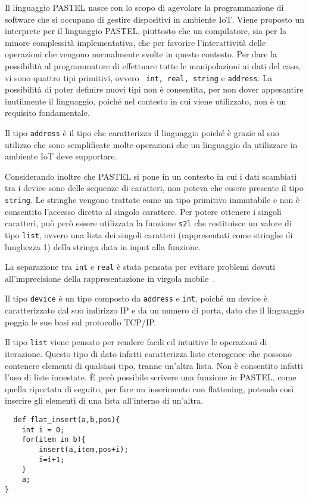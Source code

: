 \documentclass[10pt]{article}
\begin{document}
Il linguaggio PASTEL nasce con lo scopo di agevolare la programmazione di software che si occupano di gestire dispositivi in ambiente IoT. Viene proposto un interprete per il linguaggio PASTEL, piuttosto che un compilatore, sia per la minore complessità implementativa, che per favorire l'interattività delle operazioni che vengono normalmente svolte in questo contesto. Per dare la possibilità al programmatore di effettuare tutte le manipolazioni ai dati del caso, vi sono quattro tipi primitivi, ovvero \texttt{ int, real, string} e \texttt{address}. La possibilità di poter definire nuovi tipi non è consentita, per non dover appesantire inutilmente il linguaggio, poiché nel contesto in cui viene utilizzato, non è un requisito fondamentale. 

Il tipo \texttt{address} è il tipo che caratterizza il linguaggio poiché è grazie al suo utilizzo che sono semplificate molte operazioni che un linguaggio da utilizzare in ambiente IoT deve supportare. 

Considerando inoltre che PASTEL si pone in un contesto in cui i dati scambiati tra i device sono delle sequenze di caratteri, non poteva che essere presente il tipo \texttt{string}. Le stringhe vengono trattate come un tipo primitivo immutabile e non è consentito l'accesso diretto al singolo carattere. Per potere ottenere i singoli caratteri, può però essere utilizzata la funzione \texttt{s2l} che restituisce un valore di tipo \texttt{list}, ovvero una lista dei singoli caratteri (rappresentati come stringhe di lunghezza 1) della stringa data in input alla funzione. 

La separazione tra \texttt{int} e \texttt{real} è stata pensata per evitare problemi dovuti all'imprecisione della rappresentazione in virgola mobile~\cite{benz2012dynamic}. 

Il tipo \texttt{device} è un tipo composto da \texttt{address} e \texttt{int}, poiché un device è caratterizzato dal suo indirizzo IP e da un numero di porta, dato che il linguaggio poggia le sue basi sul protocollo TCP/IP. 

Il tipo \texttt{list} viene pensato per rendere facili ed intuitive le operazioni di iterazione. Questo tipo di dato infatti caratterizza liste eterogenee che possono contenere elementi di qualsiasi tipo, tranne un'altra lista. Non è consentito infatti l'uso di liste innestate. È però possibile scrivere una funzione in PASTEL, come quella riportata di seguito, per fare un inserimento con flattening, potendo così inserire gli elementi di una lista all'interno di un'altra. 
\clearpage
\begin{verbatim}
  def flat_insert(a,b,pos){
    int i = 0;
    for(item in b){
        insert(a,item,pos+i);
        i=i+1;   
    }
    a;
}
\end{verbatim}
\end{document}
